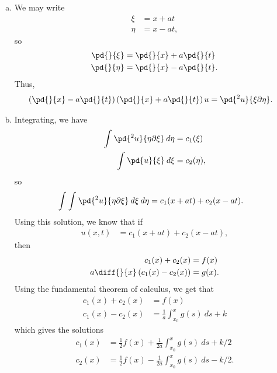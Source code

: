 \documentclass[10pt]{mypackage}
\begin{document}
\RaggedRight
\renewcommand{\arraystretch}{1.75}
\begin{solution}[12.4, Problem 14]\hfill
  \begin{enumerate}[(a)]
    \item We may write
      \begin{align*}
        \xi &=x + at\\
        \eta &= x- at,
      \end{align*}
      so
      \begin{align*}
        \pd{}{\xi} &= \pd{}{x} + a\pd{}{t}\\
        \pd{}{\eta} &= \pd{}{x} - a\pd{}{t}.
      \end{align*}
      Thus,
      \begin{align*}
        \left( \pd{}{x}-a\pd{}{t} \right)\left( \pd{}{x} + a\pd{}{t} \right) u &= \pd{^2u}{\xi\partial\eta}.
      \end{align*}
    \item Integrating, we have
      \begin{align*}
        \int_{}^{} \pd{^2u}{\eta\partial \xi}\:d\eta &= c_1(\xi)\\
        \int_{}^{} \pd{u}{\xi}\:d\xi &= c_2(\eta),
      \end{align*}
      so
      \begin{align*}
        \int_{}^{} \int_{}^{} \pd{^2u}{\eta\partial \xi}\:d\xi\:d\eta &= c_1(x+at) + c_2(x-at).
      \end{align*}
      Using this solution, we know that if
      \begin{align*}
        u\left( x,t \right) &= c_1(x+at) + c_2(x-at),
      \end{align*}
      then
      \begin{align*}
        c_1(x) + c_2(x) &= f(x)\\
        a\diff{}{x}\left( c_1(x) - c_2(x) \right) &= g(x).
      \end{align*}
      Using the fundamental theorem of calculus, we get that
      \begin{align*}
        c_1(x) + c_2(x) &= f(x)\\
        c_1(x) - c_2(x) &= \frac{1}{a} \int_{x_0}^{x} g(s)\:ds + k
      \end{align*}
      which gives the solutions
      \begin{align*}
        c_1(x) &= \frac{1}{2}f(x) + \frac{1}{2a} \int_{x_0}^{x} g(s)\:ds + k/2\\
        c_2(x) &= \frac{1}{2}f(x) - \frac{1}{2a} \int_{x_0}^{x} g(s)\:ds - k/2.

\end{align*}
\end{enumerate}
\end{solution}
\end{document}
